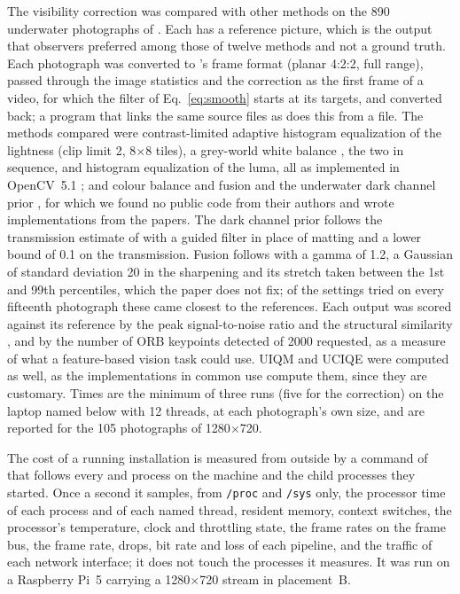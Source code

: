 The visibility correction was compared with other methods on the 890
underwater photographs of \cite{li2020uieb}. Each has a reference picture,
which is the output that observers preferred among those of twelve methods and
not a ground truth. Each photograph was converted to \eeye{}'s frame format
(planar 4:2:2, full range), passed through the image statistics and the
correction as the first frame of a video, for which the filter of
Eq.~\eqref{eq:smooth} starts at its targets, and converted back; a program
that links the same source files as \eeye{} does this from a file. The methods
compared were contrast-limited adaptive histogram equalization of the lightness
\cite{zuiderveld1994} (clip limit 2, 8$\times$8 tiles), a grey-world white
balance \cite{buchsbaum1980}, the two in sequence, and histogram equalization of
the luma, all as implemented in OpenCV~5.1 \cite{pulli2012}; and colour balance
and fusion \cite{ancuti2018} and the underwater dark channel prior
\cite{drews2013}, for which we found no public code from their authors and wrote
implementations from the papers. The dark channel prior follows the
transmission estimate of \cite{drews2013} with a guided filter in place of
matting and a lower bound of 0.1 on the transmission. Fusion follows
\cite{ancuti2018} with a gamma of 1.2, a Gaussian of standard deviation 20 in
the sharpening and its stretch taken between the 1st and 99th percentiles,
which the paper does not fix; of the settings tried on every fifteenth
photograph these came closest to the references. Each output was scored against its reference by
the peak signal-to-noise ratio and the structural similarity \cite{wang2004},
and by the number of ORB keypoints \cite{rublee2011} detected of 2000 requested,
as a measure of what a feature-based vision task could use. UIQM and UCIQE were
computed as well, as the implementations in common use compute them, since they
are customary. Times are the minimum of three runs (five for the correction) on
the laptop named below with 12 threads, at each photograph's own size, and are
reported for the 105 photographs of 1280$\times$720.

The cost of a running installation is measured from outside by a command of
\hellion{} that follows every \eeye{} and \hellion{} process on the
machine and the
child processes they started. Once a second it samples, from \texttt{/proc} and
\texttt{/sys} only, the processor time of each process and of each named thread,
resident memory, context switches, the processor's temperature, clock
and throttling
state, the frame rates on the frame bus, the frame rate, drops, bit
rate and loss of
each pipeline, and the traffic of each network interface; it does not touch the
processes it measures. It was run on a Raspberry Pi~5 carrying a 1280$\times$720
stream in placement~B.

